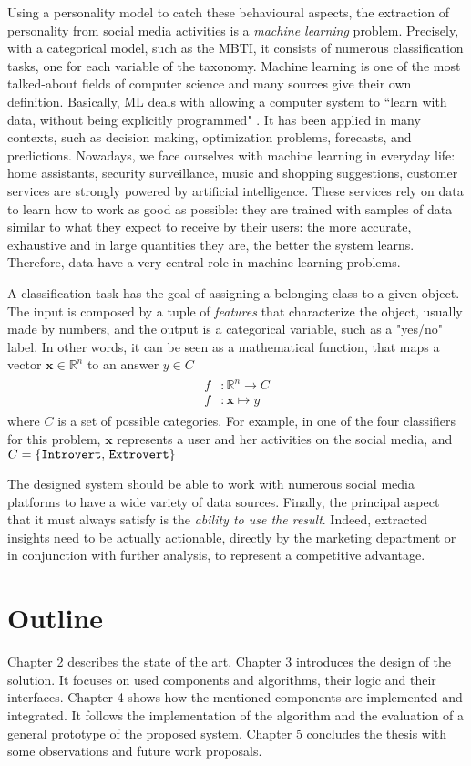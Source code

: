 Using a personality model to catch these behavioural aspects, the extraction of personality from social media activities is a \textit{machine learning} problem. Precisely, with a categorical model, such as the MBTI, it consists of numerous classification tasks, one for each variable of the taxonomy.
Machine learning is one of the most talked-about fields of computer science and many sources give their own definition. Basically, ML deals with allowing a computer system to ``learn with data, without being explicitly programmed" \cite{samuel1959some}.
It has been applied in many contexts, such as decision making, optimization problems, forecasts, and predictions.
Nowadays, we face ourselves with machine learning in everyday life: home assistants, security surveillance, music and shopping suggestions, customer services are strongly powered by artificial intelligence.
These services rely on data to learn how to work as good as possible: they are trained with samples of data similar to what they expect to receive by their users: the more accurate, exhaustive and in large quantities they are, the better the system learns. Therefore, data have a very central role in machine learning problems.

A classification task has the goal of assigning a belonging class to a given object. The input is composed by a tuple of \emph{features} that characterize the object, usually made by numbers, and the output is a categorical variable, such as a "yes/no" label. In other words, it can be seen as a mathematical function, that maps a vector $ \boldsymbol{x} \in \mathbb{R}^n $ to an answer $ y \in C $
\begin{gather*}
\begin{split}
f & \colon \mathbb{R}^n \to C \\
f & \colon \boldsymbol{x} \mapsto y
\end{split}
\end{gather*}
where $C$ is a set of possible categories.
For example, in one of the four classifiers for this problem, $ \boldsymbol{x} $ represents a user and her activities on the social media, and $C = \{\text{\texttt{Introvert}, \texttt{Extrovert}}\}$

The designed system should be able to work with numerous social media platforms to have a wide variety of data sources.
Finally, the principal aspect that it must always satisfy is the \emph{ability to use the result}. Indeed, extracted insights need to be actually actionable, directly by the marketing department or in conjunction with further analysis, to represent a competitive advantage.
\section{Outline}

Chapter 2 describes the state of the art. Chapter 3 introduces the design of the solution. It focuses on used components and algorithms, their logic and their interfaces. 
Chapter 4 shows how the mentioned components are implemented and integrated. It follows the implementation of the algorithm and the evaluation of a general prototype of the proposed system. 
Chapter 5 concludes the thesis with some observations and future work proposals.